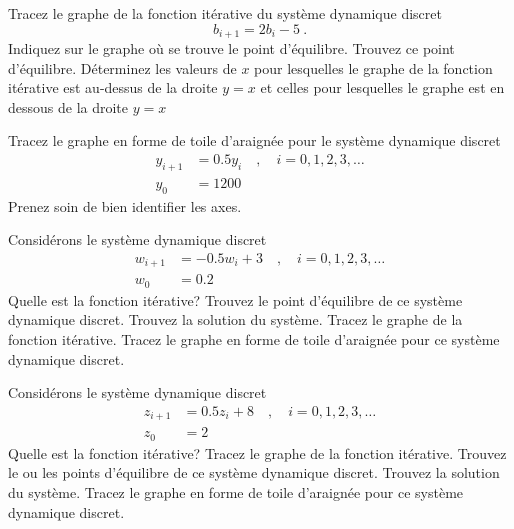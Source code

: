 \begin{question}[\life]
Tracez le graphe de la fonction itérative du système dynamique
discret
\[
b_{i+1} = 2 b_i - 5  \ .
\]
Indiquez sur le graphe où se trouve le point d'équilibre.  Trouvez ce
point d'équilibre.  Déterminez les valeurs de $x$ pour lesquelles le 
graphe de la fonction itérative est au-dessus de la droite $y=x$ et
celles pour lesquelles le graphe est en dessous de la droite $y=x$
\label{6Q81}
\end{question}

\begin{question}[\life]
Tracez le graphe en forme de toile d'araignée pour le système
dynamique discret
\begin{align*}
y_{i+1} &= 0.5 y_i \quad , \quad i=0, 1, 2, 3, \ldots \\
y_0 &= 1200
\end{align*}
Prenez soin de bien identifier les axes.
\label{6Q82}
\end{question}

\begin{question}[\life]
Considérons le système dynamique discret
\begin{align*}
w_{i+1} &= -0.5 w_i + 3 \quad , \quad i=0, 1, 2, 3, \ldots \\
w_0 &= 0.2
\end{align*}
Quelle est la fonction itérative?  Trouvez le point d'équilibre de ce
système dynamique discret.  Trouvez la solution du système.
Tracez le graphe de la fonction itérative.  Tracez le graphe en forme
de toile d'araignée pour ce système dynamique discret.
\label{6Q83}
\end{question}

\begin{question}[\life]
Considérons le système dynamique discret
\begin{align*}
z_{i+1} &= 0.5 z_i + 8  \quad , \quad i=0, 1, 2, 3, \ldots \\
z_0 & = 2
\end{align*}
Quelle est la fonction itérative?  Tracez le graphe de la fonction
itérative.  Trouvez le ou les points d'équilibre de ce système dynamique
discret.  Trouvez la solution du système.  Tracez le graphe en forme
de toile d'araignée pour ce système dynamique discret.
\label{6Q84}
\end{question}

